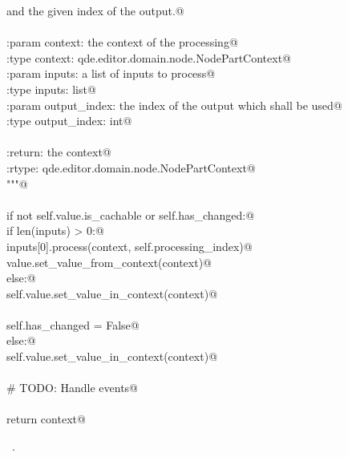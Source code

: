 \documentclass[
    a4paper,      %
    10pt,         %
    openright,    %
    notitlepage,  %
    parskip=half, %
]{scrreprt}       %
\theoremstyle{definition}                    %
\begin{document}
\begin{flushleft}
\begin{minipage}{\linewidth}
\begin{list}{}{}
\mbox{}\lstinline@        and the given index of the output.@\\
\mbox{}\lstinline@@\\
\mbox{}\lstinline@        :param context: the context of the processing@\\
\mbox{}\lstinline@        :type  context: qde.editor.domain.node.NodePartContext@\\
\mbox{}\lstinline@        :param inputs: a list of inputs to process@\\
\mbox{}\lstinline@        :type inputs: list@\\
\mbox{}\lstinline@        :param output_index: the index of the output which shall be used@\\
\mbox{}\lstinline@        :type output_index: int@\\
\mbox{}\lstinline@@\\
\mbox{}\lstinline@        :return: the context@\\
\mbox{}\lstinline@        :rtype:  qde.editor.domain.node.NodePartContext@\\
\mbox{}\lstinline@        """@\\
\mbox{}\lstinline@@\\
\mbox{}\lstinline@        if not self.value.is_cachable or self.has_changed:@\\
\mbox{}\lstinline@            if len(inputs) > 0:@\\
\mbox{}\lstinline@                inputs[0].process(context, self.processing_index)@\\
\mbox{}\lstinline@                value.set_value_from_context(context)@\\
\mbox{}\lstinline@            else:@\\
\mbox{}\lstinline@                self.value.set_value_in_context(context)@\\
\mbox{}\lstinline@@\\
\mbox{}\lstinline@            self.has_changed = False@\\
\mbox{}\lstinline@        else:@\\
\mbox{}\lstinline@            self.value.set_value_in_context(context)@\\
\mbox{}\lstinline@@\\
\mbox{}\lstinline@        # TODO: Handle events@\\
\mbox{}\lstinline@@\\
\mbox{}\lstinline@        return context@{\NWsep}
\end{list}
\vspace{-1.5ex}
\footnotesize
\begin{list}{}{\setlength{\itemsep}{-\parsep}\setlength{\itemindent}{-\leftmargin}}
\item \NWtxtMacroRefIn\ .

\item{}
\end{list}
\end{minipage}\vspace{4ex}
\end{flushleft}
\end{document}
